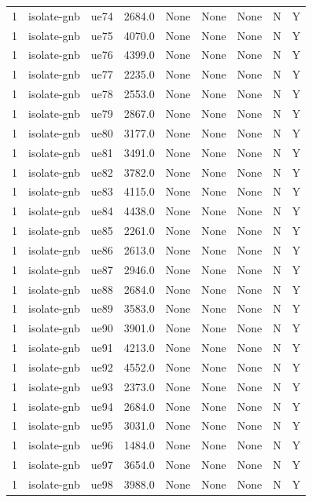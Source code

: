 \begin{table}[ht]
\begin{tabular}{|c|c|c|c|c|c|c|c|c|}
1 & isolate-gnb & ue74 & 2684.0 & None & None & None & N & Y \\
1 & isolate-gnb & ue75 & 4070.0 & None & None & None & N & Y \\
1 & isolate-gnb & ue76 & 4399.0 & None & None & None & N & Y \\
1 & isolate-gnb & ue77 & 2235.0 & None & None & None & N & Y \\
1 & isolate-gnb & ue78 & 2553.0 & None & None & None & N & Y \\
1 & isolate-gnb & ue79 & 2867.0 & None & None & None & N & Y \\
1 & isolate-gnb & ue80 & 3177.0 & None & None & None & N & Y \\
1 & isolate-gnb & ue81 & 3491.0 & None & None & None & N & Y \\
1 & isolate-gnb & ue82 & 3782.0 & None & None & None & N & Y \\
1 & isolate-gnb & ue83 & 4115.0 & None & None & None & N & Y \\
1 & isolate-gnb & ue84 & 4438.0 & None & None & None & N & Y \\
1 & isolate-gnb & ue85 & 2261.0 & None & None & None & N & Y \\
1 & isolate-gnb & ue86 & 2613.0 & None & None & None & N & Y \\
1 & isolate-gnb & ue87 & 2946.0 & None & None & None & N & Y \\
1 & isolate-gnb & ue88 & 2684.0 & None & None & None & N & Y \\
1 & isolate-gnb & ue89 & 3583.0 & None & None & None & N & Y \\
1 & isolate-gnb & ue90 & 3901.0 & None & None & None & N & Y \\
1 & isolate-gnb & ue91 & 4213.0 & None & None & None & N & Y \\
1 & isolate-gnb & ue92 & 4552.0 & None & None & None & N & Y \\
1 & isolate-gnb & ue93 & 2373.0 & None & None & None & N & Y \\
1 & isolate-gnb & ue94 & 2684.0 & None & None & None & N & Y \\
1 & isolate-gnb & ue95 & 3031.0 & None & None & None & N & Y \\
1 & isolate-gnb & ue96 & 1484.0 & None & None & None & N & Y \\
1 & isolate-gnb & ue97 & 3654.0 & None & None & None & N & Y \\
1 & isolate-gnb & ue98 & 3988.0 & None & None & None & N & Y \\

\end{tabular}
\end{table}
